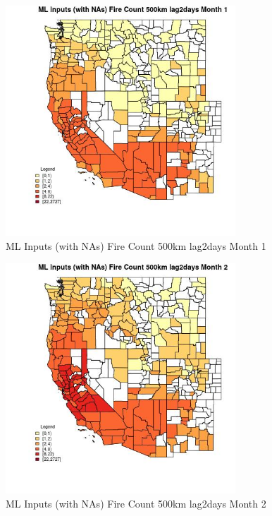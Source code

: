 \begin{figure} 
\centering  
\includegraphics[width=0.77\textwidth]{Code_Outputs/Report_ML_input_PM25_Step4_part_f_de_duplicated_aves_prioritize_24hr_obswNAs_CountyFire_Count_500km_lag2daysmedianMonth1.jpg} 
\caption{\label{fig:Report_ML_input_PM25_Step4_part_f_de_duplicated_aves_prioritize_24hr_obswNAsCountyFire_Count_500km_lag2daysmedianMonth1}ML Inputs (with NAs) Fire Count 500km lag2days Month 1} 
\end{figure} 
 

\begin{figure} 
\centering  
\includegraphics[width=0.77\textwidth]{Code_Outputs/Report_ML_input_PM25_Step4_part_f_de_duplicated_aves_prioritize_24hr_obswNAs_CountyFire_Count_500km_lag2daysmedianMonth2.jpg} 
\caption{\label{fig:Report_ML_input_PM25_Step4_part_f_de_duplicated_aves_prioritize_24hr_obswNAsCountyFire_Count_500km_lag2daysmedianMonth2}ML Inputs (with NAs) Fire Count 500km lag2days Month 2} 
\end{figure} 
 

